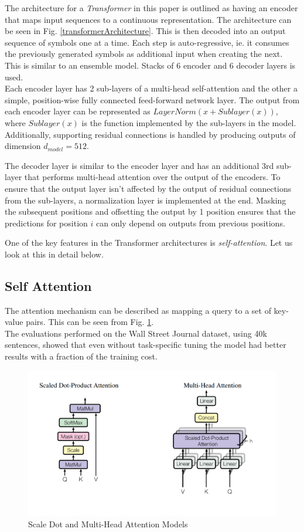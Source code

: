 \documentclass[a4paper,12pt]{report}
\begin{document}
			The architecture for a \textit{Transformer} in this paper is outlined as having an encoder that maps input sequences to a continuous representation. The architecture can be seen in Fig. \ref{transformerArchitecture}. This is then decoded into an output sequence of symbols one at a time. Each step is auto-regressive, ie. it consumes the previously generated symbols as additional input when creating the next. This is similar to an ensemble model. Stacks of 6 encoder and 6 decoder layers is used.\\
			Each encoder layer has 2 sub-layers of a multi-head self-attention and the other a simple, position-wise fully connected feed-forward network layer. The output from each encoder layer can be represented as $  LayerNorm(x + Sublayer(x)) $, where $ Sublayer(x) $ is the function implemented by the sub-layers in the model. Additionally, supporting residual connections is handled by producing outputs of dimension $ d_{model}=512 $.

			The decoder layer is similar to the encoder layer and has an additional 3rd sub-layer that performs multi-head attention over the output of the encoders. To ensure that the output layer isn't affected by the output of residual connections from the sub-layers, a normalization layer is implemented at the end. Masking the subsequent positions and offsetting the output by 1 position ensures that the predictions for position $ i $ can only depend on outputs from previous positions.

			One of the key features in the Transformer architectures is \textit{self-attention}. Let us look at this in detail below.
			\subsection{Self Attention}\label{231}
			The attention mechanism can be described as mapping a query to a set of key-value pairs. This can be seen from Fig. \ref{multiHeadAttention}. \\The evaluations performed on the Wall Street Journal dataset\citep{wsj}, using 40k sentences, showed that even without task-specific tuning the model had better results with a fraction of the training cost.
			\begin{figure}[h!]
				\centering
				\includegraphics[scale=0.4]{../images/multihead.png}
				\caption{Scale Dot and Multi-Head Attention Models \cite{atayl}}\label{multiHeadAttention}
			\end{figure}
\end{document}
